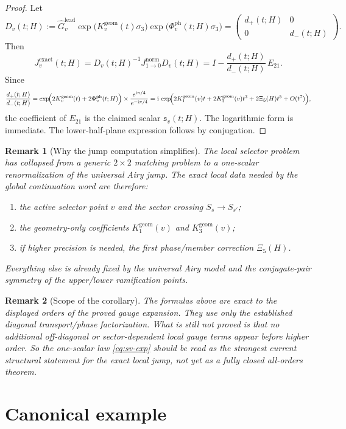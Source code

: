\documentclass[11pt]{article}
\newtheorem{remark}{Remark}
\newcommand{\ii}{\mathrm i}
\newcommand{\leadG}{\widehat G_v^{\mathrm{lead}}}
\newcommand{\phP}{\Phi_v^{\mathrm{ph}}}
\newcommand{\Kone}{K_1^{\mathrm{geom}}(v)}
\newcommand{\Kthree}{K_3^{\mathrm{geom}}(v)}
\newcommand{\Etwone}{E_{21}}
\begin{document}
\begin{proof}
Let
\[
 D_v(t;H):=\leadG\exp\!\bigl(K^{\mathrm{geom}}_v(t)\sigma_3\bigr)\exp\!\bigl(\phP(t;H)\sigma_3\bigr)
 =\begin{pmatrix}d_+(t;H)&0\\0&d_-(t;H)\end{pmatrix}.
\]
Then
\[
 J_v^{\mathrm{exact}}(t;H)=D_v(t;H)^{-1}J^{\mathrm{norm}}_{1\to0}D_v(t;H)
 =I-\frac{d_+(t;H)}{d_-(t;H)}\,\Etwone.
\]
 Since
\[
 \frac{d_+(t;H)}{d_-(t;H)}
 =
 \exp\!\Bigl(
 2K^{\mathrm{geom}}_v(t)+2\phP(t;H)
 \Bigr)
 \times \frac{e^{\ii\pi/4}}{e^{-\ii\pi/4}}
 =
 \ii\,\exp\!\Bigl(
 2\Kone t+2\Kthree t^3+2\Xi_5(H)t^5+O(t^7)
 \Bigr),
\]
 the coefficient of $\Etwone$ is the claimed scalar $\mathfrak s_v(t;H)$.  The logarithmic form is immediate.  The lower-half-plane expression follows by conjugation.
\end{proof}

\begin{remark}[Why the jump computation simplifies]
\label{rem:jump-simplifies}
The local selector problem has collapsed from a generic $2\times 2$ matching problem to a one-scalar renormalization of the universal Airy jump.  The exact local data needed by the global continuation word are therefore:
\begin{enumerate}
  \item the active selector point $v$ and the sector crossing $S_s\to S_{s'}$;
  \item the geometry-only coefficients $\Kone$ and $\Kthree$;
  \item if higher precision is needed, the first phase/member correction $\Xi_5(H)$.
\end{enumerate}
Everything else is already fixed by the universal Airy model and the conjugate-pair symmetry of the upper/lower ramification points.
\end{remark}

\begin{remark}[Scope of the corollary]
\label{rem:scope-jump}
The formulas above are exact to the displayed orders of the proved gauge expansion.  They use only the established diagonal transport/phase factorization.  What is still not proved is that no additional off-diagonal or sector-dependent local gauge terms appear before higher order.  So the one-scalar law \eqref{eq:sv-exp} should be read as the strongest current structural statement for the exact local jump, not yet as a fully closed all-orders theorem.
\end{remark}
\section{Canonical example}
\end{document}
